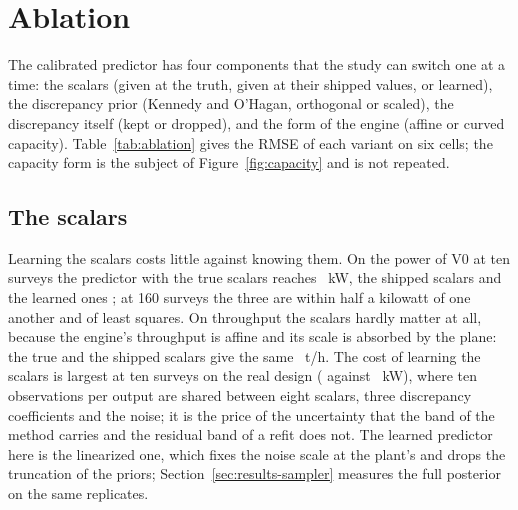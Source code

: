\section{Ablation}\label{sec:ablation}

The calibrated predictor has four components that the study can switch one at a time: the scalars (given at the truth,
given at their shipped values, or learned), the discrepancy prior (Kennedy and O'Hagan, orthogonal or scaled), the
discrepancy itself (kept or dropped), and the form of the engine (affine or curved capacity). Table~\ref{tab:ablation} gives
the RMSE of each variant on six cells; the capacity form is the subject of Figure~\ref{fig:capacity} and is not repeated.

\begin{table}[!t]
\caption{Ablation of the calibrated predictor: RMSE (kW for power, t/h for throughput) on six cells with the scalars at the
truth, at their shipped values and learned under the three discrepancy priors, with the discrepancy dropped (the engine refit
alone), and least squares on the setting and the feed size for reference; \repsPerCell{} replicates per cell.}
\label{tab:ablation}
\centering\footnotesize
\resizebox{\columnwidth}{!}{}
\end{table}

\subsection{The scalars}

Learning the scalars costs little against knowing them. On the power of V0 at ten surveys the predictor with the true scalars
reaches \rVzeroSTenKwOr~kW, the shipped scalars \rVzeroSTenKwNom{} and the learned ones \rVzeroSTenKwKo; at 160 surveys the
three are within half a kilowatt of one another and of least squares. On throughput the scalars hardly matter at all, because
the engine's throughput is affine and its scale is absorbed by the plane: the true and the shipped scalars give the same
\rVzeroSTenTphOr~t/h. The cost of learning the scalars is largest at ten surveys on the real design (\rVzeroRealKwKo{} against
\rVzeroRealKwOr~kW), where ten observations per output are shared between eight scalars, three discrepancy coefficients
and the noise; it is the price of the uncertainty that the band of the method carries and the residual band of a refit does not.
The learned predictor here is the linearized one, which fixes the noise scale at the plant's and drops the truncation of the
priors; Section~\ref{sec:results-sampler} measures the full posterior on the same replicates.

